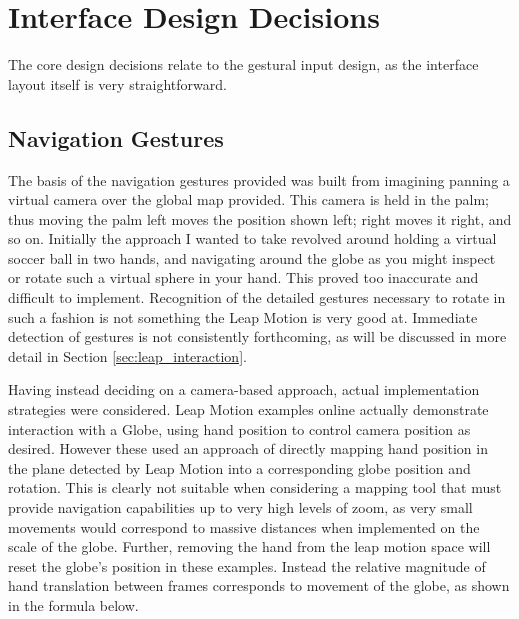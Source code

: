 \documentclass{sigplanconf}
\begin{document}
\section{Interface Design Decisions}
\label{sec:design_decisions}

The core design decisions relate to the gestural input design, as the interface layout itself is very straightforward. 

\subsection{Navigation Gestures}

The basis of the navigation gestures provided was built from imagining panning a virtual camera over the global map provided. This camera is held in the palm; thus moving the palm left moves the position shown left; right moves it right, and so on. Initially the approach I wanted to take revolved around holding a virtual soccer ball in two hands, and navigating around the globe as you might inspect or rotate such a virtual sphere in your hand. This proved too inaccurate and difficult to implement. Recognition of the detailed gestures necessary to rotate in such a fashion is not something the Leap Motion is very good at. Immediate detection of gestures is not consistently forthcoming, as will be discussed in more detail in Section \ref{sec:leap_interaction}.


Having instead deciding on a camera-based approach, actual implementation strategies were considered. Leap Motion examples online actually demonstrate interaction with a Globe, using hand position to control camera position as desired. However these used an approach of directly mapping hand position in the plane detected by Leap Motion into a corresponding globe position and rotation. This is clearly not suitable when considering a mapping tool that must provide navigation capabilities up to very high levels of zoom, as very small movements would correspond to massive distances when implemented on the scale of the globe. Further, removing the hand from the leap motion space will reset the globe's position in these examples. Instead the relative magnitude of hand translation between frames corresponds to movement of the globe, as shown in the formula below.
\end{document}

